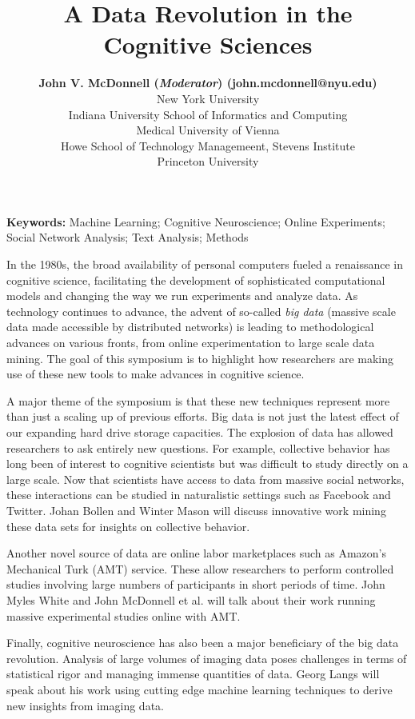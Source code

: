 \documentclass[10pt,letterpaper]{article}
\title{A Data Revolution in the Cognitive Sciences}
\author{{\large \bf John V. McDonnell (\emph{Moderator}) (john.mcdonnell@nyu.edu)} \\ 
  New York University
  \AND {\large \bf Johan Bollen (jbollen@indiana.edu)} \\
  Indiana University School of Informatics and Computing
  \AND {\large \bf Georg Langs (georg.langs@meduniwien.ac.at)} \\
  Medical University of Vienna
  \AND {\large \bf Winter Mason (m@winteram.com)} \\
  Howe School of Technology Managemeent, Stevens Institute 
  \AND {\large \bf John Myles White (jmw@johnmyleswhite.com)} \\
  Princeton University}
\begin{document}
\maketitle

\begin{footnotesize}
\textbf{Keywords:} 
Machine Learning; Cognitive Neuroscience; Online Experiments; Social Network
Analysis; Text Analysis; Methods
\end{footnotesize}

In the 1980s, the broad availability of personal computers fueled a renaissance
in cognitive science, facilitating the development of sophisticated computational
models and changing the way we run experiments and analyze data. As technology
continues to advance, the advent of so-called \emph{big data} (massive scale data
made accessible by distributed networks) is leading to methodological advances on
various fronts, from online experimentation to large scale data mining. The goal
of this symposium is to highlight how researchers are making use of these new
tools to make advances in cognitive science.

A major theme of the symposium is that these new techniques represent more than
just a scaling up of previous efforts. Big data is not just the latest effect of
our expanding hard drive storage capacities. The explosion of data has allowed
researchers to ask entirely new questions. For example, collective behavior has
long been of interest to cognitive scientists but was difficult to study directly
on a large scale. Now that scientists have access to data from massive social
networks, these interactions can be studied in naturalistic settings such as
Facebook and Twitter. Johan Bollen and Winter Mason will discuss innovative
work mining these data sets for insights on collective behavior.

Another novel source of data are online labor marketplaces such as Amazon's
Mechanical Turk (AMT) service. These allow researchers to perform controlled
studies involving large numbers of participants in short periods of time. John
Myles White and John McDonnell et al. will talk about their work running massive
experimental studies online with AMT.

Finally, cognitive neuroscience has also been a major beneficiary of the big data
revolution. Analysis of large volumes of imaging data poses challenges in terms
of statistical rigor and managing immense quantities of data. Georg Langs will
speak about his work using cutting edge machine learning techniques to derive new
insights from imaging data.
\end{document}
